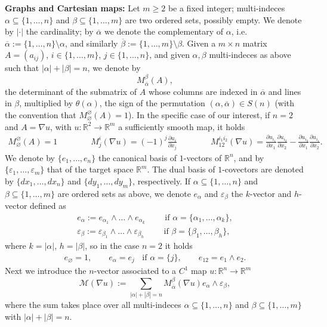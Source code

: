 \documentclass[a4paper,11pt]{article}
\numberwithin{equation}{section}
\newcommand{\R}{\mathbb{R}}
\begin{document}
\textbf{Graphs and Cartesian maps:}
Let $m\geq 2$ be a fixed integer; multi-indeces $\alpha\subseteq\{1,\dots,n\}$ and $\beta\subseteq\{1,\dots,m\}$ are two ordered sets, possibly empty. We denote by $|\cdot|$ the cardinality; by $\overline\alpha$ we denote the complementary of $\alpha$, i.e. $\overline \alpha:=\{1,\dots,n\}\setminus \alpha$, and similarly $\overline\beta:=\{1,\dots,m\}\setminus \beta$. Given a $m\times n$ matrix $A=(a_{ij})$, $i\in \{1,\dots,m\}$, $j\in \{1,\dots,n\}$, and given $\alpha,\beta$ multi-indeces as above such that $|\alpha|+|\beta|=n$, we denote by $$M_{\overline \alpha}^\beta(A),$$
the determinant of the submatrix of $A$ whose columns are indexed in $\overline \alpha$ and lines in $\beta$,  multiplied by $\theta(\alpha)$, the sign of the permutation $(\alpha,\overline\alpha)\in S(n)$ (with the convention that $M_\varnothing^\varnothing(A)=1$). In the specific case of our interest, if $n=2$ and  $A=\nabla u$, with $u:\R^2\rightarrow \R^m$ a sufficiently smooth map, it holds
\begin{align*}
M_\varnothing^\varnothing(A)=1\qquad \qquad 	M_{j}^{i}(\nabla u)=(-1)^j\frac{\partial u_i}{\partial x_j}\qquad \qquad M_{12}^{i_1i_2}(\nabla u)=\frac{\partial u_{i_1}}{\partial x_1}\frac{\partial u_{i_2}}{\partial x_2}-\frac{\partial u_{i_2}}{\partial x_1}\frac{\partial u_{i_1}}{\partial x_2}.
\end{align*}
We denote by $\{e_1,\dots, e_n\}$ the canonical basis of $1$-vectors of $\R^n$, and by $\{\varepsilon_1,\dots,\varepsilon_m\}$ that of the target space $\R^m$. The dual basis of $1$-covectors are denoted by $\{dx_1,\dots,dx_n\}$ and $\{dy_1,\dots,dy_m\}$, respectively. If $\alpha\subseteq \{1,\dots,n\}$ and $\beta\subseteq\{1,\dots,m\}$ are ordered sets as above, we denote $e_\alpha$ and $\varepsilon_\beta$ the $k$-vector and $h$-vector defined as 
\begin{align}
e_\alpha:=e_{\alpha_1}\wedge\dots\wedge e_{\alpha_k}\qquad \text{ if }\alpha=\{\alpha_1,\dots,\alpha_k\},\\
\varepsilon_\beta:=\varepsilon_{\beta_1}\wedge\dots\wedge \varepsilon_{\beta_h}\qquad \text{ if }\beta=\{\beta_1,\dots,\beta_h\},
\end{align}
where $k=|\alpha|$, $h=|\beta|$, so in the case $n=2$ it holds
\begin{align}
e_\varnothing=1,\qquad e_\alpha=e_j\;\;\text{ if }\alpha=\{j\},\qquad e_{12}=e_1\wedge e_2.
\end{align}
Next we introduce the $n$-vector associated to a $C^1$ map  $u:\R^n\rightarrow \R^m$
$$\mathcal M(\nabla u):=\sum_{|\alpha|+|\beta|=n}M_{\overline \alpha}^\beta(\nabla u)e_\alpha\wedge \varepsilon_\beta,$$
where the sum takes place over all multi-indeces $\alpha\subseteq\{1,\dots,n\}$ and $\beta\subseteq\{1,\dots,m\}$ with $|\alpha|+|\beta|=n$.
\end{document}
